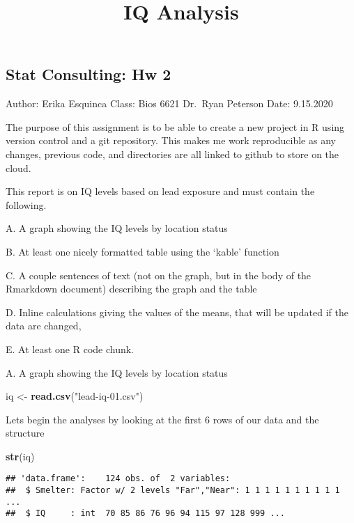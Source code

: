 \documentclass[]{article}
\title{IQ Analysis}
\author{}
\date{}
\newenvironment{Shaded}{\begin{snugshade}}{\end{snugshade}}
\newcommand{\KeywordTok}[1]{\textcolor[rgb]{0.13,0.29,0.53}{\textbf{#1}}}
\newcommand{\StringTok}[1]{\textcolor[rgb]{0.31,0.60,0.02}{#1}}
\newcommand{\NormalTok}[1]{#1}
\begin{document}
\maketitle

\subsection{Stat Consulting: Hw 2}\label{stat-consulting-hw-2}

Author: Erika Esquinca Class: Bios 6621 Dr.~Ryan Peterson Date:
9.15.2020

The purpose of this assignment is to be able to create a new project in
R using version control and a git repository. This makes me work
reproducible as any changes, previous code, and directories are all
linked to github to store on the cloud.

This report is on IQ levels based on lead exposure and must contain the
following.

A. A graph showing the IQ levels by location status

B. At least one nicely formatted table using the `kable' function

C. A couple sentences of text (not on the graph, but in the body of the
Rmarkdown document) describing the graph and the table

D. Inline calculations giving the values of the means, that will be
updated if the data are changed,

E. At least one R code chunk.

A. A graph showing the IQ levels by location status

\begin{Shaded}
\begin{Highlighting}[]
\NormalTok{iq <-}\StringTok{ }\KeywordTok{read.csv}\NormalTok{(}\StringTok{"lead-iq-01.csv"}\NormalTok{)}
\end{Highlighting}
\end{Shaded}

Lets begin the analyses by looking at the first 6 rows of our data and
the structure

\begin{Shaded}
\begin{Highlighting}[]
\KeywordTok{str}\NormalTok{(iq)}
\end{Highlighting}
\end{Shaded}

\begin{verbatim}
## 'data.frame':    124 obs. of  2 variables:
##  $ Smelter: Factor w/ 2 levels "Far","Near": 1 1 1 1 1 1 1 1 1 1 ...
##  $ IQ     : int  70 85 86 76 96 94 115 97 128 999 ...
\end{verbatim}
\end{document}

